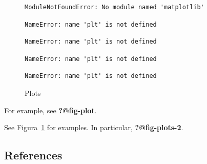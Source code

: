\documentclass[
  spanish,
  12pt,
  letterpaper,
  DIV=11,
  numbers=noendperiod]{scrreprt}
\begin{document}
\begin{figure}

\begin{minipage}[t]{0.50\linewidth}

\begin{verbatim}
ModuleNotFoundError: No module named 'matplotlib'
\end{verbatim}

\end{minipage}%
%
\begin{minipage}[t]{0.50\linewidth}

\begin{verbatim}
NameError: name 'plt' is not defined
\end{verbatim}

\end{minipage}%
\newline
\begin{minipage}[t]{0.50\linewidth}

\begin{verbatim}
NameError: name 'plt' is not defined
\end{verbatim}

\end{minipage}%
%
\begin{minipage}[t]{0.50\linewidth}

\begin{verbatim}
NameError: name 'plt' is not defined
\end{verbatim}

\end{minipage}%
\newline
\begin{minipage}[t]{0.50\linewidth}

\begin{verbatim}
NameError: name 'plt' is not defined
\end{verbatim}

\end{minipage}%

\caption{\label{fig-plots}Plots}

\end{figure}%

For example, see \textbf{?@fig-plot}.

See Figura~\ref{fig-plots} for examples. In particular,
\textbf{?@fig-plots-2}.

\subsection{References}\label{references-3}
\end{document}
